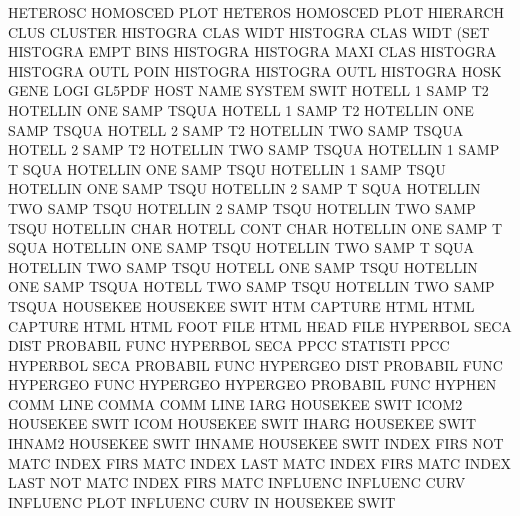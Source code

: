 HETEROSC                                HOMOSCED PLOT
HETEROS                                 HOMOSCED PLOT
HIERARCH CLUS                           CLUSTER
HISTOGRA CLAS WIDT                      HISTOGRA CLAS WIDT (SET
HISTOGRA EMPT BINS                      HISTOGRA
HISTOGRA MAXI CLAS                      HISTOGRA
HISTOGRA OUTL POIN                      HISTOGRA
HISTOGRA OUTL                           HISTOGRA
HOSK     GENE LOGI                      GL5PDF
HOST     NAME                           SYSTEM   SWIT
HOTELL   1    SAMP T2                   HOTELLIN ONE  SAMP TSQUA
HOTELL   1    SAMP T2                   HOTELLIN ONE  SAMP TSQUA
HOTELL   2    SAMP T2                   HOTELLIN TWO  SAMP TSQUA
HOTELL   2    SAMP T2                   HOTELLIN TWO  SAMP TSQUA
HOTELLIN 1    SAMP T    SQUA            HOTELLIN ONE  SAMP TSQU
HOTELLIN 1    SAMP TSQU                 HOTELLIN ONE  SAMP TSQU
HOTELLIN 2    SAMP T    SQUA            HOTELLIN TWO  SAMP TSQU
HOTELLIN 2    SAMP TSQU                 HOTELLIN TWO  SAMP TSQU
HOTELLIN CHAR                           HOTELL   CONT CHAR
HOTELLIN ONE  SAMP T    SQUA            HOTELLIN ONE  SAMP TSQU
HOTELLIN TWO  SAMP T    SQUA            HOTELLIN TWO  SAMP TSQU
HOTELL   ONE  SAMP TSQU                 HOTELLIN ONE  SAMP TSQUA
HOTELL   TWO  SAMP TSQU                 HOTELLIN TWO  SAMP TSQUA
HOUSEKEE                                HOUSEKEE SWIT
HTM                                     CAPTURE  HTML
HTML                                    CAPTURE  HTML
HTML     FOOT FILE                      HTML     HEAD FILE
HYPERBOL SECA DIST                      PROBABIL FUNC
HYPERBOL SECA PPCC                      STATISTI PPCC
HYPERBOL SECA                           PROBABIL FUNC
HYPERGEO DIST                           PROBABIL FUNC
HYPERGEO FUNC                           HYPERGEO
HYPERGEO                                PROBABIL FUNC
HYPHEN   COMM LINE                      COMMA    COMM LINE
IARG                                    HOUSEKEE SWIT
ICOM2                                   HOUSEKEE SWIT
ICOM                                    HOUSEKEE SWIT
IHARG                                   HOUSEKEE SWIT
IHNAM2                                  HOUSEKEE SWIT
IHNAME                                  HOUSEKEE SWIT
INDEX    FIRS NOT  MATC                 INDEX    FIRS MATC
INDEX    LAST MATC                      INDEX    FIRS MATC
INDEX    LAST NOT  MATC                 INDEX    FIRS MATC
INFLUENC                                INFLUENC CURV
INFLUENC PLOT                           INFLUENC CURV
IN                                      HOUSEKEE SWIT
